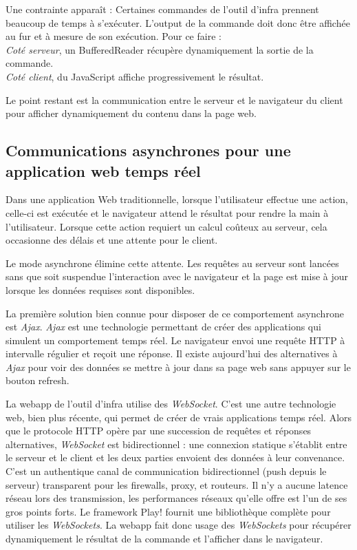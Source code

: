 Une contrainte apparaît :
Certaines commandes de l'outil d'infra prennent beaucoup de temps à s'exécuter.
L'output de la commande doit donc être affichée au fur et à mesure de son
exécution. Pour ce faire :\\
\textit{Coté serveur}, un BufferedReader récupère dynamiquement la sortie de la commande.\\
\textit{Coté client}, du JavaScript affiche progressivement le résultat.

Le point restant est la communication entre le serveur et le navigateur du
client pour afficher dynamiquement du contenu dans la page web.

\subsection{Communications asynchrones pour une application web temps réel}

Dans une application Web traditionnelle, lorsque l'utilisateur effectue une
action, celle-ci est exécutée et le navigateur attend le résultat pour rendre
la main à l'utilisateur. Lorsque cette action requiert un calcul coûteux
au serveur, cela occasionne des délais et une attente pour le client.

Le mode asynchrone élimine cette attente. Les requêtes au serveur sont lancées
sans que soit suspendue l'interaction avec le navigateur et la page est mise à
jour lorsque les données requises sont disponibles.

La première solution bien connue pour disposer de ce comportement asynchrone est
\textit{Ajax}.
\textit{Ajax} est une technologie permettant de créer des applications qui simulent un
comportement temps réel. Le navigateur envoi une requête HTTP à intervalle
régulier et reçoit une réponse.
Il existe aujourd'hui des alternatives à \textit{Ajax} pour voir des données se
mettre à jour dans sa page web sans appuyer sur le bouton refresh.

La webapp de l'outil d'infra utilise des \textit{WebSocket}.
C'est une autre technologie web, bien plus récente, qui permet de créer de vrais
applications temps réel.
Alors que le protocole HTTP opère par une succession de requêtes et réponses
alternatives, \textit{WebSocket} est bidirectionnel : une connexion statique s'établit
entre le serveur et le client et les deux parties envoient des données à leur
convenance.
C'est un authentique canal de communication bidirectionnel (push depuis le
serveur) transparent pour les firewalls, proxy, et routeurs.
Il n'y a aucune latence réseau lors des transmission, les performances réseaux
qu'elle offre est l'un de ses gros points forts.
Le framework Play! fournit une bibliothèque complète pour utiliser les
\textit{WebSockets}.
La webapp fait donc usage des \textit{WebSockets} pour récupérer dynamiquement le
résultat de la commande et l'afficher dans le navigateur.


